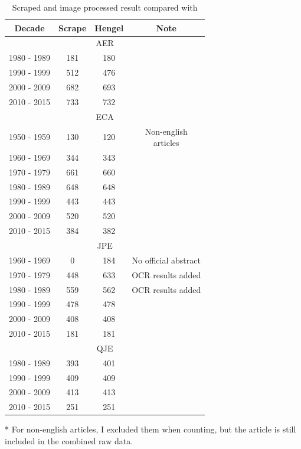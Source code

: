 \begin{table}[t]
    \centering
    \caption{Scraped and image processed result compared with \cite{Hengel17}}
    \label{tab:compare_scrape}
    \begin{threeparttable}
    \begin{tabular}{*4c}
        \toprule
        Decade & Scrape & Hengel & Note \\
        \midrule
        \multicolumn{4}{c}{AER} \\
        \midrule
        1980 - 1989  & 181 & 180 & \\
        1990 - 1999  & 512 & 476 & \\
        2000 - 2009  & 682 & 693 & \\
        2010 - 2015  & 733 & 732 & \\
        \midrule

        \multicolumn{4}{c}{ECA} \\
        \midrule
        1950 - 1959 & 130 & 120 & \makecell{Non-english \\ articles} \\
        1960 - 1969 & 344 & 343 & \\
        1970 - 1979 & 661 & 660 & \\
        1980 - 1989 & 648 & 648 & \\
        1990 - 1999 & 443 & 443 & \\
        2000 - 2009 & 520 & 520 & \\
        2010 - 2015 & 384 & 382 & \\
        
        \midrule

        \multicolumn{4}{c}{JPE} \\
        \midrule
        1960 - 1969 & 0 & 184 & No official abstract \\
        1970 - 1979 & 448 & 633 & OCR results added \\
        1980 - 1989 & 559 & 562 & OCR results added \\
        1990 - 1999 & 478 & 478 & \\
        2000 - 2009 & 408 & 408 & \\
        2010 - 2015 & 181 & 181 & \\

        \midrule

        \multicolumn{4}{c}{QJE} \\
        \midrule
        1980 - 1989 & 393 & 401 & \\
        1990 - 1999 & 409 & 409 & \\
        2000 - 2009 & 413 & 413 & \\
        2010 - 2015 & 251 & 251 & \\
        \bottomrule
    \end{tabular}
    \begin{tablenotes}
        \small
        \item[*] For non-english articles, I excluded them when counting, but the article is still included in the combined raw data.
    \end{tablenotes}
\end{threeparttable}
\end{table}
